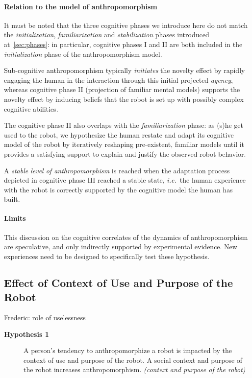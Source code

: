 \documentclass[lettersize, apacite, twoside, HRI]{apa_HRI}
\newcommand{\ie}{{\textit{i.e.~}}}
\begin{document}
\paragraph{Relation to the model of anthropomorphism} It must be noted that the
three cognitive phases we introduce here do not match the
\emph{initialization}, \emph{familiarization} and \emph{stabilization} phases
introduced at~\ref{sec:phases}: in particular, cognitive phases I and II are
both included in the \emph{initialization} phase of the anthropomorphism model.

Sub-cognitive anthropomorphism typically \emph{initiates} the novelty effect by
rapidly engaging the human in the interaction through this initial projected
\emph{agency}, whereas cognitive phase II (projection of familiar mental
models) supports the novelty effect by inducing beliefs that the robot is set
up with possibly complex cognitive abilities.

The cognitive phase II also overlaps with the \emph{familiarization} phase: as
(s)he get used to the robot, we hypothesize the human restate and adapt its
cognitive model of the robot by iteratively reshaping pre-existent, familiar
models until it provides a satisfying support to explain and justify the
observed robot behavior.

A \emph{stable level of anthropomorphism} is reached when the adaptation
process depicted in cognitive phase III reached a stable state, \ie the human
experience with the robot is correctly supported by the cognitive model the
human has built.

\paragraph{Limits} This discussion on the cognitive correlates of the dynamics
of anthropomorphism are speculative, and only indirectly supported by
experimental evidence. New experiences need to be designed to specifically test
these hypothesis.

\subsection{Effect of Context of Use and Purpose of the Robot}
\label{sec:8.1}
Frederic: role of uselessness


\begin{description}
	\item[\textbf{Hypothesis 1}] A person's tendency to anthropomorphize a robot is impacted by the context of use and purpose of the robot. A social context and purpose of the robot increases anthropomorphism. \textit{(context and purpose of the robot)}
\end{description}
\end{document}
